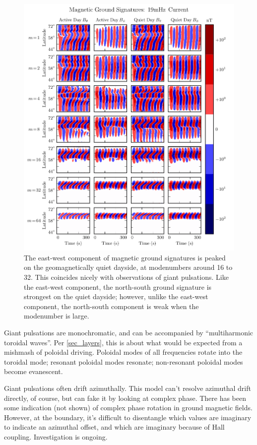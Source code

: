 \begin{figure}[H]
    \centering
    \includegraphics[width=\textwidth]{figures/ground_19mHz.pdf}
    \caption[Dayside Ground Magnetic Fields]{
      The east-west component of magnetic ground signatures is peaked on the geomagnetically quiet dayside, at modenumbers around 16 to 32. This coincides nicely with observations of giant pulsations. Like the east-west component, the north-south ground signature is strongest on the quiet dayside; however, unlike the east-west component, the north-south component is weak when the modenumber is large. 
    }
    \label{fig_ground_signatures}
\end{figure}

Giant pulsations are monochromatic, and can be accompanied by ``multiharmonic toroidal waves''\cite{takahashi_2011}. Per \cref{sec_layers}, this is about what would be expected from a mishmash of poloidal driving. Poloidal modes of all frequencies rotate into the toroidal mode; resonant poloidal modes resonate; non-resonant poloidal modes become evanescent. 

Giant pulsations often drift azimuthally. This model can't resolve azimuthal drift directly, of course, but can fake it by looking at complex phase. There has been some indication (not shown) of complex phase rotation in ground magnetic fields. However, at the boundary, it's difficult to disentangle which values are imaginary to indicate an azimuthal offset, and which are imaginary because of Hall coupling. Investigation is ongoing. 
















